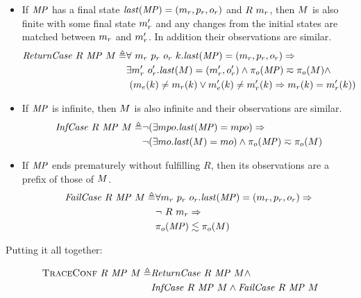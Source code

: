 \documentclass[acmsmall,review,anonymous]{acmart}\settopmatter{printfolios=true,printccs=false,printacmref=false}
\begin{document}
{\begin{itemize}
  \item If \(\mathit{MP}\) has a final state \(\mathit{last}(\mathit{MP}) = (m_r,p_r,o_r)\) and \(R\ \mach_r\), then \(M\) is also finite with
    some final state \(m_r'\) and any changes from the initial states are
    matched between \(m_r\) and \(m_r'\). In addition their
    observations are similar.
    \[\begin{split}
      \mathit{ReturnCase} ~ R ~ \mathit{MP} ~ M \triangleq &
      \forall ~ m_r ~ p_r ~ o_r ~ k . \mathit{last}(\mathit{MP}) =
        (m_r,p_r,o_r) \Rightarrow \\
      & \exists m_r' ~ o_r' . \mathit{last}(M) = (m_r',o_r')
        \land \pi_o(\mathit{MP}) \eqsim \pi_o(M) \land \\
      & ~ (m_e(k) \not = m_r(k)
        \lor m_e'(k) \not = m_r'(k) \Rightarrow
      m_r(k) = m_r'(k))
    \end{split}\]
  \item If \(\mathit{MP}\) is infinite, then \(M\) is also infinite and their
  observations are similar.
    \[\begin{split}
      \mathit{InfCase} ~ R ~ \mathit{MP} ~ M \triangleq
      & \neg (\exists mpo . \mathit{last}(\mathit{MP}) = mpo) \Rightarrow \\
      & \neg (\exists mo . \mathit{last}(M) = mo)
        \land \pi_o(\mathit{MP}) \eqsim \pi_o(M)
    \end{split}\]
\item If \(\mathit{MP}\) ends prematurely without fulfilling \(R\), then
  its observations are a prefix of those of \(M\).
    \[\begin{split}
      \mathit{FailCase} ~ R ~ \mathit{MP} ~ M \triangleq
      & \forall m_r ~ p_r ~ o_r .
        \mathit{last}(\mathit{MP}) = (m_r,p_r,o_r) \Rightarrow \\
      & \neg ~ R ~ m_r \Rightarrow \\
      & \pi_o(\mathit{MP}) \lesssim \pi_o(M)
    \end{split}\]
\end{itemize}

Putting it all together:

\[\begin{split}
  \text{\sc TraceConf} ~ R ~ \mathit{MP} ~ M \triangleq
  & \mathit{ReturnCase} ~ R ~ \mathit{MP} ~ M \land \\
  & \mathit{InfCase} ~ R ~ \mathit{MP} ~ M \land
    \mathit{FailCase} ~ R ~ \mathit{MP} ~ M \\
\end{split}\]

}
\end{document}

